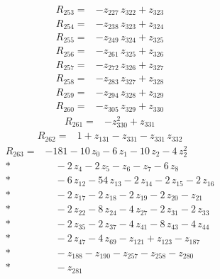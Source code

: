 \documentclass[10pt]{article}
\begin{document}
\begin{align*}
R_{253}={}& - z_{227}\,z_{322} + z_{323}
\end{align*}
\begin{align*}
R_{254}={}& - z_{238}\,z_{323} + z_{324}
\end{align*}
\begin{align*}
R_{255}={}& - z_{249}\,z_{324} + z_{325}
\end{align*}
\begin{align*}
R_{256}={}& - z_{261}\,z_{325} + z_{326}
\end{align*}
\begin{align*}
R_{257}={}& - z_{272}\,z_{326} + z_{327}
\end{align*}
\begin{align*}
R_{258}={}& - z_{283}\,z_{327} + z_{328}
\end{align*}
\begin{align*}
R_{259}={}& - z_{294}\,z_{328} + z_{329}
\end{align*}
\begin{align*}
R_{260}={}& - z_{305}\,z_{329} + z_{330}
\end{align*}
\begin{align*}
R_{261}={}& - z_{330}^{2} + z_{331}
\end{align*}
\begin{align*}
R_{262}={}& 1 + z_{131} - z_{331} - z_{331}\,z_{332}
\end{align*}
\begin{align*}
R_{263}={}& - 181 - 10\,z_{0} - 6\,z_{1} - 10\,z_{2} - 4\,z_{2}^{2} \\*
&\quad - 2\,z_{4} - 2\,z_{5} - z_{6} - z_{7} - 6\,z_{8} \\*
&\quad - 6\,z_{12} - 54\,z_{13} - 2\,z_{14} - 2\,z_{15} - 2\,z_{16} \\*
&\quad - 2\,z_{17} - 2\,z_{18} - 2\,z_{19} - 2\,z_{20} - z_{21} \\*
&\quad - 2\,z_{22} - 8\,z_{24} - 4\,z_{27} - 2\,z_{31} - 2\,z_{33} \\*
&\quad - 2\,z_{35} - 2\,z_{37} - 4\,z_{41} - 8\,z_{43} - 4\,z_{44} \\*
&\quad - 2\,z_{47} - 4\,z_{69} - z_{121} + z_{123} - z_{187} \\*
&\quad - z_{188} - z_{190} - z_{257} - z_{258} - z_{280} \\*
&\quad - z_{281}
\end{align*}
\end{document}
